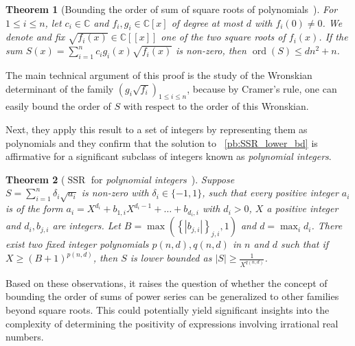 \documentclass[a4paper, 11pt,dvipsnames]{article}
\newtheorem{theorem}{Theorem}
\newcommand\abs[1]{\left|#1\right|}
\newcommand{\ord}{\operatorname{ord}}
\newcommand{\SSR}{\operatorname{SSR}}
\begin{document}
\begin{theorem}[Bounding the order of sum of square roots of polynomials~\cite{kayal2012sum}] \label{thm:order_SSR}
For $1 \le i \le n$, let $c_i \in \mathbb{C}$ and  $f_i, g_i \in \mathbb{C}[x]$ of degree at most $d$ with $f_i(0) \neq  0$. We denote and fix
$\sqrt{f_i(x)} \in \mathbb{C}[[x]]$ one of the two square roots of $f_i(x)$. If the sum $S(x) = \sum_{i=1}^{n} c_i g_i(x) \sqrt{f_i(x)} $ is non-zero, then $\ord(S)\leq dn^2+n$.
\end{theorem}
The main technical argument of this proof is the study of the Wronskian determinant of the family $(g_i\sqrt{f_i})_{1 \le i \le n}$, because by Cramer's rule,
one can easily bound the order of $S$ with respect to the order of this Wronskian. 

Next, they apply this result to a set of integers by representing them as polynomials and they confirm that the solution to ~\cref{pb:SSR_lower_bd} is affirmative for a significant subclass of integers known as \emph{polynomial integers}.

\begin{theorem}[$\SSR$ for \emph{polynomial integers}~\cite{kayal2012sum}] Suppose \\ $S = \sum_{i=1}^{n} \delta_i \sqrt{a_i}$ is non-zero with $\delta_i \in \{-1,1\}$, such that
  every positive integer $a_i$ is of the form $a_i = X^{d_i} + b_{1,i}X^{d_i -1} + \dots + b_{d_i,i}$ with $d_i >0$, $X$ a positive integer and $d_i, b_{j,i}$ are
  integers. Let $B = \max \left( \left\{\left| b_{j,i} \right| \right\}_{j,i}, 1 \right)$ and $d = \max_i d_i$. 
  There exist two fixed integer polynomials $p(n,d), q(n,d)$ in $n$ and $d$ such that if $X \ge (B+1)^{p(n,d)}$, then $S$ is lower bounded as $\abs{S} \ge \frac{1}{X^{q(n,d)}}$. 
\label{thm:SSR_PolynomialInteger} 
\end{theorem}

Based on these observations, it raises the question of whether the concept of bounding the order of sums of power series can be generalized to other families beyond square roots. This could potentially yield significant insights into the complexity of determining the positivity of expressions involving irrational real numbers.
\end{document}
